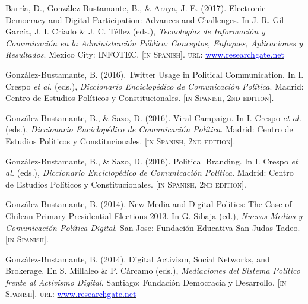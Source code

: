 \begin{publications}
\begin{benumerate}{12}
\item{\small Barr\'ia, D., Gonz\'alez-Bustamante, B., \& Araya, J. E. (2017). Electronic Democracy and Digital Participation: Advances and Challenges. In J. R. Gil-Garc\'ia, J. I. Criado \&  J. C. T\'ellez (eds.), {\itshape Tecnolog\'ias de Informaci\'on y Comunicaci\'on en la Administraci\'on P\'ublica: Conceptos, Enfoques, Aplicaciones y Resultados}. Mexico City: INFOTEC. {\footnotesize \scshape [in Spanish]}. {\scshape url}: \href{https://www.researchgate.net/publication/321980289_Democracia_electronica_y_participacion_digital_Avances_y_desafios}{\textcolor{blue}{www.researchgate.net}}}\vspace{1mm}

\item{\small Gonz\'alez-Bustamante, B. (2016). Twitter Usage in Political Communication. In I. Crespo {\itshape et al.} (eds.), {\itshape Diccionario Enciclop\'edico de Comunicaci\'on Pol\'itica}. Madrid: Centro de Estudios Políticos y Constitucionales. {\footnotesize \scshape [in Spanish, 2nd edition]}.}\vspace{1mm}

\item{\small Gonz\'alez-Bustamante, B., \& Sazo, D. (2016). Viral Campaign. In I. Crespo {\itshape et al.} (eds.), {\itshape Diccionario Enciclop\'edico de Comunicaci\'on Pol\'itica}. Madrid: Centro de Estudios Políticos y Constitucionales. {\footnotesize \scshape [in Spanish, 2nd edition]}.}\vspace{1mm}

\item{\small Gonz\'alez-Bustamante, B., \& Sazo, D. (2016). Political Branding. In I. Crespo {\itshape et al.} (eds.), {\itshape Diccionario Enciclop\'edico de Comunicaci\'on Pol\'itica}. Madrid: Centro de Estudios Políticos y Constitucionales. {\footnotesize \scshape [in Spanish, 2nd edition]}.}\vspace{1mm}

\item{\small Gonz\'alez-Bustamante, B. (2014). New Media and Digital Politics: The Case of Chilean Primary Presidential Elections 2013. In G. Sibaja (ed.), {\itshape Nuevos Medios y Comunicaci\'on Pol\'itica Digital}. San Jose: Fundación Educativa San Judas Tadeo. {\footnotesize \scshape [in Spanish]}.}\vspace{1mm}

\item{\small Gonz\'alez-Bustamante, B. (2014). Digital Activism, Social Networks, and Brokerage. En S. Millaleo \& P. C\'arcamo (eds.), {\itshape Mediaciones del Sistema Pol\'itico frente al Activismo Digital}. Santiago: Fundación Democracia y Desarrollo. {\footnotesize \scshape [in Spanish]}. {\scshape url}: \href{https://www.researchgate.net/publication/321992867_Activismo_digital_redes_sociales_e_intermediacion}{\textcolor{blue}{www.researchgate.net}}}\vspace{1mm}


\end{benumerate}
\end{publications}
